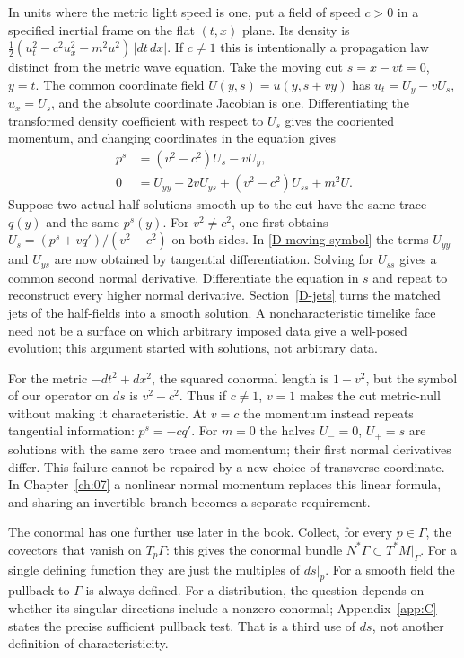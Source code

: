 In units where the metric light speed is one, put a field of speed $c>0$ in a specified inertial frame on the flat $(t,x)$ plane. Its density is $\frac12(u_t^2-c^2u_x^2-m^2u^2)\,|dt\,dx|$. If $c\ne1$ this is intentionally a propagation law distinct from the metric wave equation. Take the moving cut $s=x-vt=0$, $y=t$. The common coordinate field $U(y,s)=u(y,s+vy)$ has $u_t=U_y-vU_s$, $u_x=U_s$, and the absolute coordinate Jacobian is one. Differentiating the transformed density coefficient with respect to $U_s$ gives the cooriented momentum, and changing coordinates in the equation gives
\begin{align}
 p^s&=(v^2-c^2)U_s-vU_y,\nonumber\\
 0&=U_{yy}-2vU_{ys}+(v^2-c^2)U_{ss}+m^2U .\label{D-moving-symbol}
\end{align}
Suppose two actual half-solutions smooth up to the cut have the same trace $q(y)$ and the same $p^s(y)$. For $v^2\ne c^2$, one first obtains $U_s=(p^s+vq')/(v^2-c^2)$ on both sides. In \eqref{D-moving-symbol} the terms $U_{yy}$ and $U_{ys}$ are now obtained by tangential differentiation. Solving for $U_{ss}$ gives a common second normal derivative. Differentiate the equation in $s$ and repeat to reconstruct every higher normal derivative. Section~\ref{D-jets} turns the matched jets of the half-fields into a smooth solution. A noncharacteristic timelike face need not be a surface on which arbitrary imposed data give a well-posed evolution; this argument started with solutions, not arbitrary data.

For the metric $-dt^2+dx^2$, the squared conormal length is $1-v^2$, but the symbol of our operator on $ds$ is $v^2-c^2$. Thus if $c\ne1$, $v=1$ makes the cut metric-null without making it characteristic. At $v=c$ the momentum instead repeats tangential information: $p^s=-c q'$. For $m=0$ the halves $U_-=0$, $U_+=s$ are solutions with the same zero trace and momentum; their first normal derivatives differ. This failure cannot be repaired by a new choice of transverse coordinate. In Chapter~\ref{ch:07} a nonlinear normal momentum replaces this linear formula, and sharing an invertible branch becomes a separate requirement.

The conormal has one further use later in the book. Collect, for every $p\in\Gamma$, the covectors that vanish on $T_p\Gamma$: this gives the conormal bundle $N^*\Gamma\subset T^*M|_\Gamma$. For a single defining function they are just the multiples of $ds|_p$. For a smooth field the pullback to $\Gamma$ is always defined. For a distribution, the question depends on whether its singular directions include a nonzero conormal; Appendix~\ref{app:C} states the precise sufficient pullback test. That is a third use of $ds$, not another definition of characteristicity.

